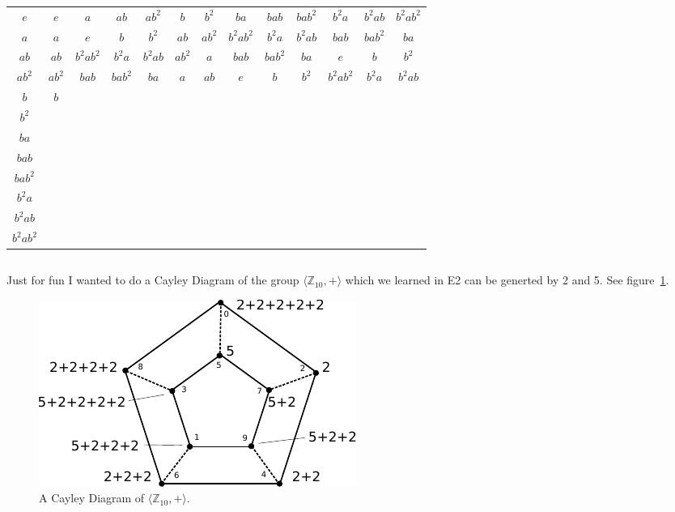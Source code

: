 \documentclass[twoside]{amsart}
\begin{document}
\begin{enumerate}[A.]
\begin{table}
\begin{tabular}{c|cccccccccccc}
$e$ & $e$ & $a$ & $ab$ & $ab^2$ & $b$ & $b^2$ & $ba$ & $bab$ & $bab^2$ &
   $b^2a$ & $b^2ab$ & $b^2ab^2$ \\

$a$ & $a$ & $e$ & $b$ & $b^2$ & $ab$ & $ab^2$ & $b^2ab^2$ & $b^2a$ & $b^2ab$ &
    $bab$ & $bab^2$ & $ba$\\

$ab$ & $ab$ & $b^2ab^2$ & $b^2a$ & $b^2ab$ & $ab^2$ & $a$ & $bab$ & $bab^2$ &
   $ba$ & $e$ & $b$ & $b^2$\\ 

$ab^2$ & $ab^2$ & $bab$ & $bab^2$ & $ba$ & $a$ & $ab$ & $e$ & $b$ & $b^2$ &
  $b^2ab^2$ & $b^2a$ & $b^2ab$   \\

$b$ & $b$ \\

$b^2$\\
$ba$\\
$bab$\\
$bab^2$\\
$b^2a$\\
$b^2ab$\\
$b^2ab^2$\\
\end{tabular}
\end{table}

\begin{verbatim}

\end{verbatim}
   \noindent Just for fun I wanted to do a Cayley Diagram of the 
   group $\langle \mathbb{Z}_{10}, + \rangle$ which we learned
   in E2 can be generted by 2 and 5. See figure~\ref{fig:cayleyZ10}.

   \begin{figure}
   \caption{A Cayley Diagram of $\langle\mathbb{Z}_{10}, + \rangle$.}
   \label{fig:cayleyZ10}
   \vspace{10pt}
   \includegraphics{img/modulo10Cayley.pdf}
   \end{figure}


\end{enumerate}
\end{document}
